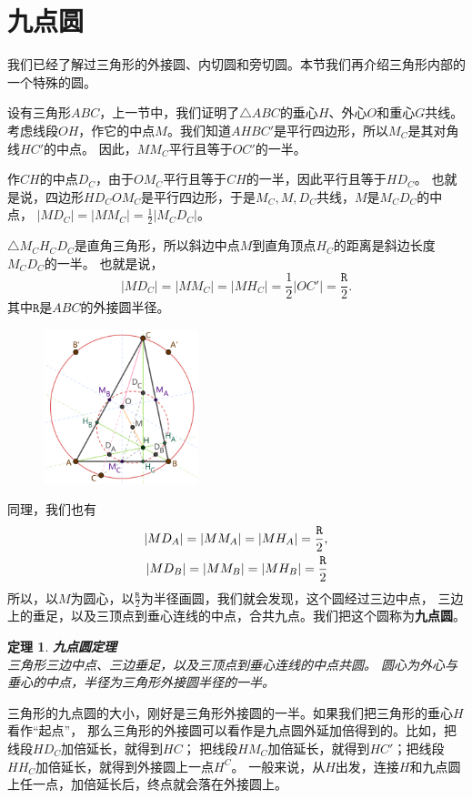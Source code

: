 \documentclass[12pt,UTF8]{ctexbook}
\newtheorem{tm}{定理}[section]
\begin{document}
\section{九点圆}

我们已经了解过三角形的外接圆、内切圆和旁切圆。本节我们再介绍三角形内部的一个特殊的圆。

设有三角形$ABC$，上一节中，我们证明了$\triangle ABC$的垂心$H$、外心$O$和重心$G$共线。
考虑线段$OH$，作它的中点$M$。我们知道$AHBC'$是平行四边形，所以$M_C$是其对角线$HC'$的中点。
因此，$MM_C$平行且等于$OC'$的一半。

作$CH$的中点$D_C$，由于$OM_C$平行且等于$CH$的一半，因此平行且等于$HD_C$。
也就是说，四边形$HD_COM_C$是平行四边形，于是$M_C, M, D_C$共线，$M$是$M_CD_C$的中点，
$|MD_C| = |MM_C| = \frac12 |M_CD_C|$。

$\triangle M_CH_CD_C$是直角三角形，所以斜边中点$M$到直角顶点$H_C$的距离是斜边长度$M_CD_C$的一半。
也就是说，
$$ |MD_C| = |MM_C| = |MH_C| = \frac12 |OC'| = \frac{\mathtt{R}}{2}.$$
其中$\mathtt{R}$是$ABC$的外接圆半径。

\begin{figure} %
    \vspace{-20pt}
    \flushright
    \includegraphics[width=0.4\textwidth]{九点圆1.png}
\end{figure}

同理，我们也有
\begin{align}
    |MD_A| = |MM_A| = |MH_A| = \frac{\mathtt{R}}{2}, \notag \\
    |MD_B| = |MM_B| = |MH_B| = \frac{\mathtt{R}}{2} \notag 
\end{align} 
所以，以$M$为圆心，以$\frac{\mathtt{R}}{2}$为半径画圆，我们就会发现，这个圆经过三边中点，
三边上的垂足，以及三顶点到垂心连线的中点，合共九点。我们把这个圆称为\textbf{九点圆}。

\begin{tm}{\textbf{九点圆定理}}\label{tm:1-3-10}
    \mbox{} \\
    三角形三边中点、三边垂足，以及三顶点到垂心连线的中点共圆。
    圆心为外心与垂心的中点，半径为三角形外接圆半径的一半。
\end{tm}
三角形的九点圆的大小，刚好是三角形外接圆的一半。如果我们把三角形的垂心$H$看作“起点”，
那么三角形的外接圆可以看作是九点圆外延加倍得到的。比如，把线段$HD_C$加倍延长，就得到$HC$；
把线段$HM_C$加倍延长，就得到$HC'$；把线段$HH_C$加倍延长，就得到外接圆上一点$H^C$。
一般来说，从$H$出发，连接$H$和九点圆上任一点，加倍延长后，终点就会落在外接圆上。
\end{document}
